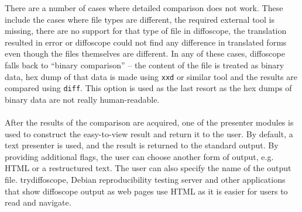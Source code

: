 There are a number of cases where detailed comparison does not work. These include the cases where file types are different, the required external tool is missing, there are no support for that type of file in diffoscope, the translation resulted in error or diffoscope could not find any difference in translated forms even though the files themselves are different. In any of these cases, diffoscope falls back to ``binary comparison'' -- the content of the file is treated as binary data, hex dump of that data is made using \texttt{xxd} or similar tool and the results are compared using \texttt{diff}. This option is used as the last resort as the hex dumps of binary data are not really human-readable.\\\\
After the results of the comparison are acquired, one of the presenter modules is used to construct the easy-to-view result and return it to the user. By default, a text presenter is used, and the result is returned to the standard output. By providing additional flags, the user can choose another form of output, e.g. HTML or a restructured text. The user can also specify the name of the output file. trydiffoscope, Debian reproducibility testing server and other applications that show diffoscope output as web pages use HTML as it is easier for users to read and navigate.


